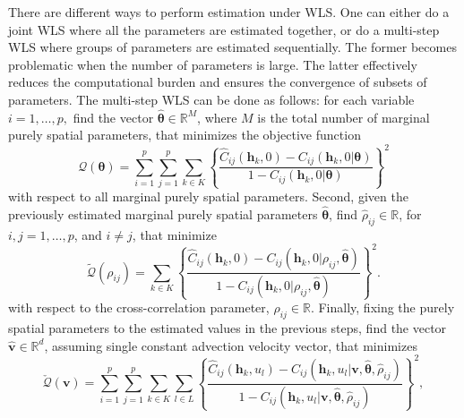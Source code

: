 \documentclass[12pt]{article}
\newcommand{\0}{\mathbf{0}}
\begin{document}
There are different ways to perform estimation under WLS. One can either do a joint WLS where all the parameters are estimated together, or do a multi-step WLS where groups of parameters are estimated sequentially. The former becomes problematic when the number of parameters is large. The latter effectively reduces the computational burden and ensures the convergence of subsets of parameters. The multi-step WLS can be done as follows: for each variable $i=1,\ldots,p,$ find the vector $\widehat{\boldsymbol{\theta}}\in \mathbb{R}^M$, where $M$ is the total number of marginal purely spatial parameters, that  minimizes the objective function
\begin{equation}\label{eqn:objective_function1}
\mathcal{Q}(\boldsymbol{\theta})=\sum_{i=1}^{p}\sum_{j=1}^{p} \sum_{k \in K}\left\{\frac{\hat{C}_{ij}(\mathbf{h}_{k},0)-C_{ij}(\mathbf{h}_{k},0|\boldsymbol{\theta})}{1-C_{ij}(\mathbf{h}_{k},0|\boldsymbol{\theta})}\right\}^2
\end{equation}
with respect to all marginal purely spatial parameters. Second, given the previously estimated marginal purely spatial parameters $\widehat{\boldsymbol{\theta}}$, find $\widehat{\rho}_{ij} \in \mathbb{R}$, for $i,j=1,\ldots,p$, and $i\neq j$, that minimize 
\begin{equation}\label{eqn:objective_function2}
\tilde{\mathcal{Q}}(\rho_{ij})=\sum_{k\in K}\left\{\frac{\hat{C}_{ij}(\mathbf{h}_{k},0)-C_{ij}(\mathbf{h}_{k},0|\rho_{ij}, \widehat{\boldsymbol{\theta}})}{1-C_{ij}(\mathbf{h}_{k},0|\rho_{ij}, \widehat{\boldsymbol{\theta}})}\right\}^2.
\end{equation}
with respect to the cross-correlation parameter, $\rho_{ij} \in \mathbb{R}$. Finally, fixing the purely spatial parameters to the estimated values in the previous steps, find the vector $\widehat{\mathbf{v}}\in \mathbb{R}^{d}$, assuming single constant advection velocity vector, that minimizes 
\begin{equation}\label{estimatingv}
\check{\mathcal{Q}}(\mathbf{v})=\sum_{i=1}^{p}\sum_{j=1}^{p} \sum_{k\in K}\sum_{l\in L}\left\{\frac{\hat{C}_{ij}(\mathbf{h}_{k},u_l)-C_{ij}(\mathbf{h}_{k},u_l|\mathbf{v}, \widehat{\boldsymbol{\theta}}, \widehat{\rho}_{ij})}{1-C_{ij}(\mathbf{h}_{k},u_l|\mathbf{v}, \widehat{\boldsymbol{\theta}}, \widehat{\rho}_{ij})}\right\}^2,
\end{equation}
\end{document}
